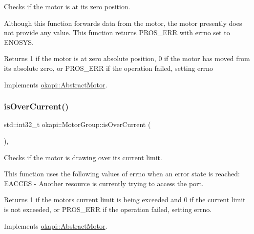 Checks if the motor is at its zero position.

Although this function forwards data from the motor, the motor presently does not provide any value. This function returns {\ttfamily P\+R\+O\+S\+\_\+\+E\+RR} with errno set to E\+N\+O\+S\+YS.

\begin{DoxyReturn}{Returns}
1 if the motor is at zero absolute position, 0 if the motor has moved from its absolute zero, or {\ttfamily P\+R\+O\+S\+\_\+\+E\+RR} if the operation failed, setting errno 
\end{DoxyReturn}


Implements \mbox{\hyperlink{classokapi_1_1AbstractMotor_a07079ee87a07b98b7008f2ce91c645ea}{okapi\+::\+Abstract\+Motor}}.

\mbox{\label{classokapi_1_1MotorGroup_ab714cb81d252599ab2933e13cc8af40d}} 
\subsubsection{\texorpdfstring{isOverCurrent()}{isOverCurrent()}}
{\footnotesize\ttfamily std\+::int32\+\_\+t okapi\+::\+Motor\+Group\+::is\+Over\+Current (\begin{DoxyParamCaption}{ }\end{DoxyParamCaption})\hspace{0.3cm}{\ttfamily [override]}, {\ttfamily [virtual]}}

Checks if the motor is drawing over its current limit.

This function uses the following values of errno when an error state is reached\+: E\+A\+C\+C\+ES -\/ Another resource is currently trying to access the port.

\begin{DoxyReturn}{Returns}
1 if the motor\textquotesingle{}s current limit is being exceeded and 0 if the current limit is not exceeded, or {\ttfamily P\+R\+O\+S\+\_\+\+E\+RR} if the operation failed, setting errno. 
\end{DoxyReturn}


Implements \mbox{\hyperlink{classokapi_1_1AbstractMotor_a3d365496ebb8566c0a12611f090c5231}{okapi\+::\+Abstract\+Motor}}.

\mbox{\label{classokapi_1_1MotorGroup_a60eaf29b00c8c0f26b9e70f3f28f74be}} 
